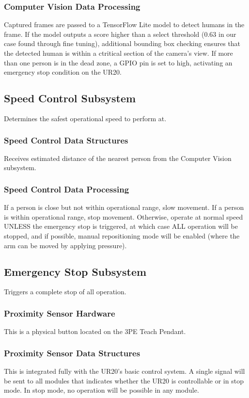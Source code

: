 \subsubsection{Computer Vision Data Processing}
Captured frames are passed to a TensorFlow Lite model to detect humans in the frame. If the model outputs a score higher than a select threshold (0.63 in our case found through fine tuning), additional bounding box checking ensures that the detected human is within a ctritical section of the camera's view. 
If more than one person is in the dead zone, a GPIO pin is set to high, activating an emergency stop condition on the UR20.


\subsection{Speed Control Subsystem}
Determines the safest operational speed to perform at.

\subsubsection{Speed Control Data Structures}
Receives estimated distance of the nearest person from the Computer Vision subsystem.

\subsubsection{Speed Control Data Processing}
If a person is close but not within operational range, slow movement. If a person is within operational range, stop movement. Otherwise, operate at normal speed UNLESS the emergency stop is triggered, at which case ALL operation will be stopped, and if possible, manual repositioning mode will be enabled (where the arm can be moved by applying pressure).

\subsection{Emergency Stop Subsystem}
Triggers a complete stop of all operation.

\subsubsection{Proximity Sensor Hardware}
This is a physical button located on the 3PE Teach Pendant. 

\subsubsection{Proximity Sensor Data Structures}
This is integrated fully with the UR20's basic control system. A single signal will be sent to all modules that indicates whether the UR20 is controllable or in stop mode. In stop mode, no operation will be possible in any module.
